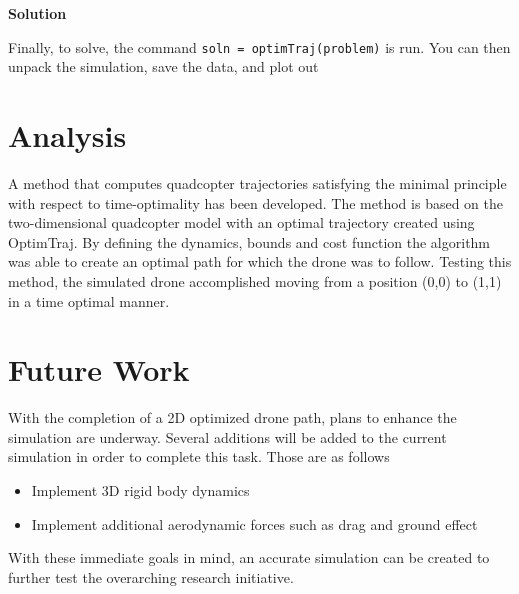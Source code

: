 \documentclass[12pt]{article}
\begin{document}
\begin{flushleft}
{\Large \textbf{\textbf{Solution}} }
\end{flushleft}
Finally, to solve, the command \lstinline!soln = optimTraj(problem)! is run. You can then unpack the simulation, save the data, and plot out
\section{Analysis}
A method that computes quadcopter trajectories satisfying the minimal principle with respect to time-optimality has been developed. The method is based on the two-dimensional quadcopter model with an optimal trajectory created using OptimTraj. By defining the dynamics, bounds and cost function the algorithm was able to create an optimal path for which the drone was to follow. Testing this method, the simulated drone accomplished moving from a position (0,0) to (1,1) in a time optimal manner.
\section{Future Work}
With the completion of a 2D optimized drone path, plans to enhance the simulation are underway. Several additions will be added to the current simulation in order to complete this task. Those are as follows 
\newline
\begin{itemize}
  \item Implement 3D rigid body dynamics
  \item Implement additional aerodynamic forces such as drag and ground effect
\end{itemize}
With these immediate goals in mind, an accurate simulation can be created to further test the overarching research initiative.



\end{document}
